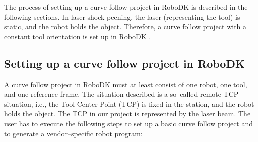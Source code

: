 The process of setting up a curve follow project in RoboDK is described in the following sections. In laser shock peening, the laser (representing the tool) is static, and the robot holds the object. Therefore, a curve follow project with a constant tool orientation is set up in RoboDK \cite{machiningproject}.

\subsection{Setting up a curve follow project in RoboDK}

A curve follow project in RoboDK must at least consist of one robot, one tool, and one reference frame. The situation described is a so--called remote TCP situation, i.e., the Tool Center Point (TCP) is fixed in the station, and the robot holds the object. The TCP in our project is represented by the laser beam. 
The user has to execute the following steps to set up a basic curve follow project and to generate a vendor--specific robot program: 

